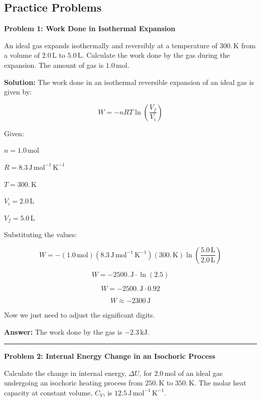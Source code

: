 \documentclass[
  9pt,
]{extbook}
\theoremstyle{definition}
\theoremstyle{definition}
\theoremstyle{definition}
\theoremstyle{definition}
\theoremstyle{remark}
\begin{document}
\subsection{Practice Problems}\label{exer3}

\textbf{Problem 1: Work Done in Isothermal Expansion}

An ideal gas expands isothermally and reversibly at a temperature of \(300. \, \text{K}\) from a volume of \(2.0 \, \text{L}\) to \(5.0 \, \text{L}\). Calculate the work done by the gas during the expansion. The amount of gas is \(1.0 \, \text{mol}\).

\textbf{Solution:} The work done in an isothermal reversible expansion of an ideal gas is given by:

\[W = -nRT \ln \left(\frac{V_f}{V_i}\right)\]

Given:

\(n = 1.0 \, \text{mol}\)

\(R = 8.3 \, \text{J} \, \text{mol}^{-1} \, \text{K}^{-1}\)

\(T = 300. \, \text{K}\)

\(V_i = 2.0 \, \text{L}\)

\(V_f = 5.0 \, \text{L}\)

Substituting the values:

\[W = - (1.0\, \text{mol}) (8.3 \, \text{J} \, \text{mol}^{-1} \, \text{K}^{-1}) (300. \, \text{K})  \ln \left(\frac{5.0\, \text{L}}{2.0\, \text{L}}\right)\]

\[W = -2500.\, \text{J} \cdot \ln \left(2.5\right)\]

\[W = -2500.\, \text{J} \cdot 0.92\]

\[W \approx -2300 \, \text{J}\]

Now we just need to adjust the significant digits.

\textbf{Answer:} The work done by the gas is \(-2.3 \, \text{kJ}\).

\begin{center}\rule{0.5\linewidth}{0.5pt}\end{center}

\textbf{Problem 2: Internal Energy Change in an Isochoric Process}

Calculate the change in internal energy, \(\Delta U\), for \(2.0 \, \text{mol}\) of an ideal gas undergoing an isochoric heating process from \(250. \, \text{K}\) to \(350. \, \text{K}\). The molar heat capacity at constant volume, \(C_V\), is \(12.5 \, \text{J} \, \text{mol}^{-1} \, \text{K}^{-1}\).
\end{document}
